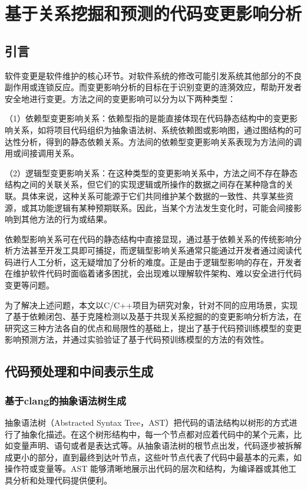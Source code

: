 
\chapter{基于关系挖掘和预测的代码变更影响分析}

\section{引言}

软件变更是软件维护的核心环节。对软件系统的修改可能引发系统其他部分的不良副作用或连锁反应。而变更影响分析的目标在于识别变更的涟漪效应，帮助开发者安全地进行变更。方法之间的变更影响可以分为以下两种类型：

（1）依赖型变更影响关系：依赖型指的是能直接体现在代码静态结构中的变更影响关系，如将项目代码组织为抽象语法树、系统依赖图或影响图，通过图结构的可达性分析，得到的静态依赖关系。方法间的依赖型变更影响关系表现为方法间的调用或间接调用关系。

（2）逻辑型变更影响关系：在这种类型的变更影响关系中，方法之间不存在静态结构之间的关联关系，但它们的实现逻辑或所操作的数据之间存在某种隐含的关联。具体来说，这种关系可能源于它们共同维护某个数据的一致性、共享某些资源，或其功能逻辑有某种预期联系。因此，当某个方法发生变化时，可能会间接影响到其他方法的行为或结果。

依赖型影响关系可在代码的静态结构中直接显现，通过基于依赖关系的传统影响分析方法甚至开发工具即可捕捉，而逻辑型影响关系通常只能通过开发者通过阅读代码进行人工分析，这无疑增加了分析的难度。正是由于逻辑型影响的存在，开发者在维护软件代码时面临着诸多困扰，会出现难以理解软件架构、难以安全进行代码变更等问题。

为了解决上述问题，本文以C/C++项目为研究对象，针对不同的应用场景，实现了基于依赖闭包、基于克隆检测以及基于共现关系挖掘的的变更影响分析方法，在研究这三种方法各自的优点和局限性的基础上，提出了基于代码预训练模型的变更影响预测方法，并通过实验验证了基于代码预训练模型的方法的有效性。


\section{代码预处理和中间表示生成}

\subsection{基于clang的抽象语法树生成}
抽象语法树（Abstracted Syntax Tree，AST）把代码的语法结构以树形的方式进行了抽象化描述。在这个树形结构中，每一个节点都对应着代码中的某个元素，比如变量声明、语句或者是表达式等。从抽象语法树的根节点出发，代码逐步被拆解成更小的部分，直到最终到达叶节点，这些叶节点代表了代码中最基本的元素，如操作符或变量等。AST 能够清晰地展示出代码的层次和结构，为编译器或其他工具分析和处理代码提供便利。


